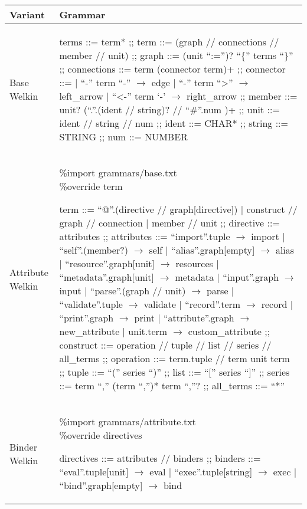 \begin{table}[hbt!]
  \centering
    \begin{tabular}{| p{1.5cm} | p{9.5cm} |}%
    \hline
    Variant & Grammar \\\hline %
      \makecell{Base \\ Welkin} &
  \begin{bnf}
  terms ::= term* ;;
  term ::= (graph // connections // member // unit) ;;
  graph ::= (unit ``:='')? ``\{'' terms ``\}'' ;;
  connections ::= term (connector term)+ ;;
	connector ::=
   | ``-'' term ``-'' $\to$ edge
   | ``-'' term ``>'' $\to$ left\_arrow
	 | ``<-'' term `-' $\to$ right\_arrow ;;
  member ::= unit? (``.''.(ident // string)? // ``\#''.num )+ ;;
	unit ::= ident // string // num ;;
  ident ::= CHAR* ;;
	string ::= STRING ;;
	num ::= NUMBER
\end{bnf} \\ %
   \hline
      Attribute Welkin &
  \makecell{\%import grammars/base.txt \\ \%override term}
  \begin{bnf}
  term ::= ``@''.(directive // graph[directive]) | construct // graph // connection | member // unit ;;
  directive ::= attributes ;;
  attributes ::= ``import''.tuple $\to$ import
  | ``self''.(member?) $\to$ self
  | ``alias''.graph[empty] $\to$ alias
  | ``resource''.graph[unit] $\to$ resources
  | ``metadata''.graph[unit] $\to$ metadata
  | ``input''.graph $\to$ input
  | ``parse''.(graph // unit) $\to$ parse
  | ``validate''.tuple $\to$ validate
  | ``record''.term $\to$ record
  | ``print''.graph $\to$ print
  | ``attribute''.graph $\to$ new\_attribute
  | unit.term $\to$ custom\_attribute ;;
  construct ::= operation // tuple // list // series // all\_terms ;;
  operation ::= term.tuple // term unit term ;;
  tuple ::= ``('' series ``)'' ;;
  list ::= ``['' series ``]'' ;;
  series ::= term ``,'' (term ``,'')* term ``,''? ;;
  all\_terms ::= ``*''
 \end{bnf} \\
   \hline
   Binder Welkin &
\makecell{\%import grammars/attribute.txt \\ \%override directives}
    \begin{bnf}
     directives ::= attributes // binders ;;
     binders ::= ``eval''.tuple[unit] $\to$ eval
     | ``exec''.tuple[string] $\to$ exec
     | ``bind''.graph[empty] $\to$ bind
   \end{bnf} \\
    \hline
    \end{tabular}
  \end{table}


